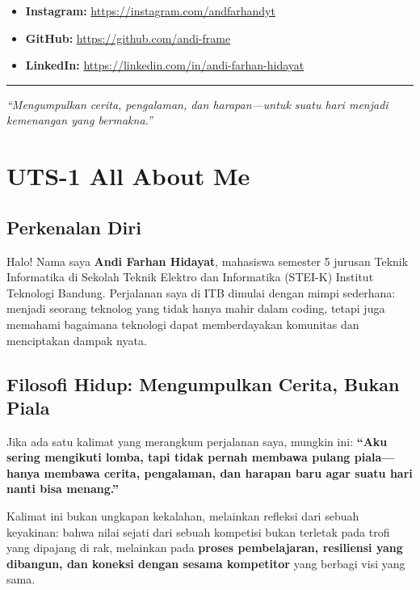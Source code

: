 \documentclass[
  letterpaper,
  DIV=11,
  numbers=noendperiod]{scrreprt}
\providecommand{\tightlist}{%
  \setlength{\itemsep}{0pt}\setlength{\parskip}{0pt}}
\begin{document}
\begin{itemize}
\tightlist
\item
  \textbf{Instagram:} \url{https://instagram.com/andfarhandyt}
\item
  \textbf{GitHub:} \url{https://github.com/andi-frame}
\item
  \textbf{LinkedIn:} \url{https://linkedin.com/in/andi-farhan-hidayat}
\end{itemize}

\begin{center}\rule{0.5\linewidth}{0.5pt}\end{center}

\emph{``Mengumpulkan cerita, pengalaman, dan harapan---untuk suatu hari
menjadi kemenangan yang bermakna.''}


\chapter{UTS-1 All About Me}\label{uts-1-all-about-me}

\section{\texorpdfstring{\textbf{Perkenalan
Diri}}{Perkenalan Diri}}\label{perkenalan-diri}

Halo! Nama saya \textbf{Andi Farhan Hidayat}, mahasiswa semester 5
jurusan Teknik Informatika di Sekolah Teknik Elektro dan Informatika
(STEI-K) Institut Teknologi Bandung. Perjalanan saya di ITB dimulai
dengan mimpi sederhana: menjadi seorang teknolog yang tidak hanya mahir
dalam coding, tetapi juga memahami bagaimana teknologi dapat
memberdayakan komunitas dan menciptakan dampak nyata.

\section{\texorpdfstring{\textbf{Filosofi Hidup: Mengumpulkan Cerita,
Bukan
Piala}}{Filosofi Hidup: Mengumpulkan Cerita, Bukan Piala}}\label{filosofi-hidup-mengumpulkan-cerita-bukan-piala}

Jika ada satu kalimat yang merangkum perjalanan saya, mungkin ini:
\textbf{``Aku sering mengikuti lomba, tapi tidak pernah membawa pulang
piala---hanya membawa cerita, pengalaman, dan harapan baru agar suatu
hari nanti bisa menang.''}

Kalimat ini bukan ungkapan kekalahan, melainkan refleksi dari sebuah
keyakinan: bahwa nilai sejati dari sebuah kompetisi bukan terletak pada
trofi yang dipajang di rak, melainkan pada \textbf{proses pembelajaran,
resiliensi yang dibangun, dan koneksi dengan sesama kompetitor} yang
berbagi visi yang sama.
\end{document}
